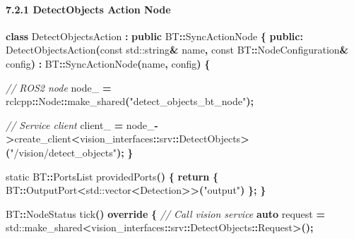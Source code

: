 \documentclass[
]{article}
\newenvironment{Shaded}{\begin{snugshade}}{\end{snugshade}}
\newcommand{\AttributeTok}[1]{\textcolor[rgb]{0.13,0.29,0.53}{#1}}
\newcommand{\BuiltInTok}[1]{#1}
\newcommand{\CommentTok}[1]{\textcolor[rgb]{0.56,0.35,0.01}{\textit{#1}}}
\newcommand{\ControlFlowTok}[1]{\textcolor[rgb]{0.13,0.29,0.53}{\textbf{#1}}}
\newcommand{\KeywordTok}[1]{\textcolor[rgb]{0.13,0.29,0.53}{\textbf{#1}}}
\newcommand{\NormalTok}[1]{#1}
\newcommand{\OperatorTok}[1]{\textcolor[rgb]{0.81,0.36,0.00}{\textbf{#1}}}
\newcommand{\StringTok}[1]{\textcolor[rgb]{0.31,0.60,0.02}{#1}}
\newcommand{\VariableTok}[1]{\textcolor[rgb]{0.00,0.00,0.00}{#1}}
\begin{document}
\hypertarget{detectobjects-action-node}{%
\paragraph{7.2.1 DetectObjects Action
Node}\label{detectobjects-action-node}}

\begin{Shaded}
\begin{Highlighting}[]
\KeywordTok{class}\NormalTok{ DetectObjectsAction }\OperatorTok{:} \KeywordTok{public}\NormalTok{ BT}\OperatorTok{::}\NormalTok{SyncActionNode }\OperatorTok{\{}
\KeywordTok{public}\OperatorTok{:}
\NormalTok{    DetectObjectsAction}\OperatorTok{(}\AttributeTok{const} \BuiltInTok{std::}\NormalTok{string}\OperatorTok{\&}\NormalTok{ name}\OperatorTok{,} \AttributeTok{const}\NormalTok{ BT}\OperatorTok{::}\NormalTok{NodeConfiguration}\OperatorTok{\&}\NormalTok{ config}\OperatorTok{)}
        \OperatorTok{:}\NormalTok{ BT}\OperatorTok{::}\NormalTok{SyncActionNode}\OperatorTok{(}\NormalTok{name}\OperatorTok{,}\NormalTok{ config}\OperatorTok{)} \OperatorTok{\{}

        \CommentTok{// ROS2 node}
        \VariableTok{node\_} \OperatorTok{=}\NormalTok{ rclcpp}\OperatorTok{::}\NormalTok{Node}\OperatorTok{::}\NormalTok{make\_shared}\OperatorTok{(}\StringTok{"detect\_objects\_bt\_node"}\OperatorTok{);}

        \CommentTok{// Service client}
        \VariableTok{client\_} \OperatorTok{=} \VariableTok{node\_}\OperatorTok{{-}\textgreater{}}\NormalTok{create\_client}\OperatorTok{\textless{}}\NormalTok{vision\_interfaces}\OperatorTok{::}\NormalTok{srv}\OperatorTok{::}\NormalTok{DetectObjects}\OperatorTok{\textgreater{}(}\StringTok{"/vision/detect\_objects"}\OperatorTok{);}
    \OperatorTok{\}}

    \AttributeTok{static}\NormalTok{ BT}\OperatorTok{::}\NormalTok{PortsList providedPorts}\OperatorTok{()} \OperatorTok{\{}
        \ControlFlowTok{return} \OperatorTok{\{}\NormalTok{ BT}\OperatorTok{::}\NormalTok{OutputPort}\OperatorTok{\textless{}}\BuiltInTok{std::}\NormalTok{vector}\OperatorTok{\textless{}}\NormalTok{Detection}\OperatorTok{\textgreater{}\textgreater{}(}\StringTok{"output"}\OperatorTok{)} \OperatorTok{\};}
    \OperatorTok{\}}

\NormalTok{    BT}\OperatorTok{::}\NormalTok{NodeStatus tick}\OperatorTok{()} \KeywordTok{override} \OperatorTok{\{}
        \CommentTok{// Call vision service}
        \KeywordTok{auto}\NormalTok{ request }\OperatorTok{=} \BuiltInTok{std::}\NormalTok{make\_shared}\OperatorTok{\textless{}}\NormalTok{vision\_interfaces}\OperatorTok{::}\NormalTok{srv}\OperatorTok{::}\NormalTok{DetectObjects}\OperatorTok{::}\NormalTok{Request}\OperatorTok{\textgreater{}();}


\end{Highlighting}
\end{Shaded}
\end{document}
